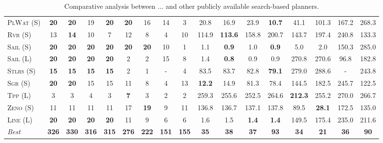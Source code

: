 \documentclass[11pt]{article}
\begin{document}
\begin{table}[tb]
{\begin{tabular}{|l||cccccccc||cccccccc||}
\textsc{PlWat} (S)&\textbf{20}&\textbf{20}&19&\textbf{20}&\textbf{20}&16&14&3&20.8&16.9&23.9&\textbf{10.7}&41.1&101.3&167.2&268.3\\
\textsc{Rvr} (S)&13&\textbf{14}&10&7&12&8&4&10&114.9&\textbf{113.6}&158.8&200.7&143.7&197.4&240.8&133.3\\
\textsc{Sail} (S)&\textbf{20}&\textbf{20}&\textbf{20}&\textbf{20}&\textbf{20}&\textbf{20}&10&1&1.1&\textbf{0.9}&1.0&\textbf{0.9}&5.0&2.0&150.3&285.0\\
\textsc{Sail} (L)&\textbf{20}&\textbf{20}&\textbf{20}&\textbf{20}&2&2&15&8&1.4&\textbf{0.8}&0.9&0.9&270.8&270.6&96.8&182.8\\
\textsc{Stlrs} (S)&\textbf{15}&\textbf{15}&\textbf{15}&\textbf{15}&2&1&-&4&83.5&83.7&82.8&\textbf{79.1}&279.0&288.6&-&243.8\\
\textsc{Sgr} (S)&\textbf{20}&\textbf{20}&15&15&11&8&4&13&\textbf{12.2}&14.9&81.3&78.4&144.5&182.5&245.7&122.5\\
\textsc{Tpp} (L)&3&3&4&3&\textbf{7}&3&2&2&259.3&255.6&252.5&264.6&\textbf{212.3}&255.2&270.0&266.7\\
\textsc{Zeno} (S)&11&11&11&11&17&\textbf{19}&9&11&136.8&136.7&137.1&137.8&89.5&\textbf{28.1}&172.5&135.0\\
\textsc{Line} (L)&\textbf{20}&\textbf{20}&\textbf{20}&\textbf{20}&11&9&6&6&1.6&1.5&\textbf{1.4}&\textbf{1.4}&149.5&175.4&235.0&211.6
\\\hline
\textit{Best}&\textbf{326}&\textbf{330}&\textbf{316}&\textbf{315}&\textbf{276}&\textbf{222}&\textbf{151}&\textbf{155}&\textbf{35}&\textbf{38}&\textbf{37}&\textbf{93}&\textbf{34}&\textbf{21}&\textbf{36}&\textbf{90}\\\hline

        \end{tabular}}
        \caption{Comparative analysis between ... and other publicly available search-based planners.}
        \label{tab:search}
        \end{table}
        
\end{document}
